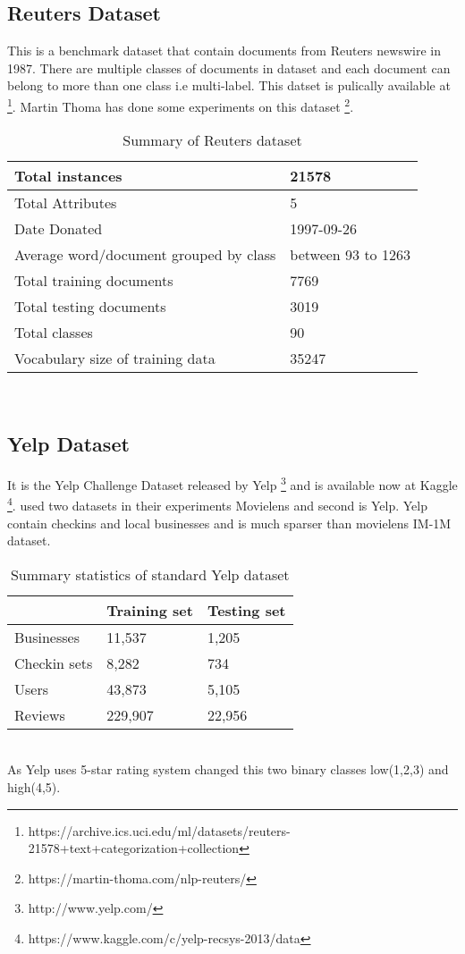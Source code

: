 \subsection{Reuters Dataset}
This is a benchmark dataset that contain documents from Reuters newswire in 1987. There are multiple classes of documents in dataset and each document can belong to more than one class i.e multi-label. This datset is pulically available at \footnote{https://archive.ics.uci.edu/ml/datasets/reuters-21578+text+categorization+collection}.  Martin Thoma has done some experiments on this dataset \footnote{https://martin-thoma.com/nlp-reuters/}.
\\
\begin{table}[!htbp] 
\centering
\footnotesize
\def\arraystretch{1.4}%
\centering
\begin{tabular}{|p{7cm}|p{3cm}|}
\hline
Total instances & 21578
\\
\hline 
Total Attributes & 5
\\
\hline 
Date Donated & 1997-09-26
\\
\hline 
Average word/document grouped by class & between 93 to 1263
\\
\hline
Total training documents & 7769 
\\
\hline
Total testing documents & 3019  
\\
\hline 
Total classes & 90
\\
\hline 
Vocabulary size of training data & 35247
\\
\hline
\end{tabular}

\caption{Summary of Reuters dataset}
\label{table:10}
\end{table}
\\
\subsection{Yelp Dataset}
It is the Yelp Challenge Dataset released by Yelp \footnote{http://www.yelp.com/} and is available now at Kaggle \footnote{https://www.kaggle.com/c/yelp-recsys-2013/data}. \cite{N17} used two datasets in their experiments Movielens and second is Yelp. Yelp contain checkins and local businesses and is much sparser than movielens IM-1M dataset. 
\\
\begin{table}[!htbp] 
\centering
\footnotesize
\def\arraystretch{1.4}%
\centering
\begin{tabular}{|p{5cm}|p{3cm}|p{3cm}|}
\hline
  & Training set & Testing set
\\
\hline 
Businesses & 11,537 & 1,205
\\
\hline 
Checkin sets & 8,282 & 734
\\
\hline 
Users & 43,873 & 5,105
\\
\hline
Reviews & 229,907 & 22,956
\\
\hline
\end{tabular}

\caption{Summary statistics of standard Yelp dataset}
\label{table:11}
\end{table}
\\
As Yelp uses 5-star rating system \cite{N27} changed this two binary classes low(1,2,3) and high(4,5). 

